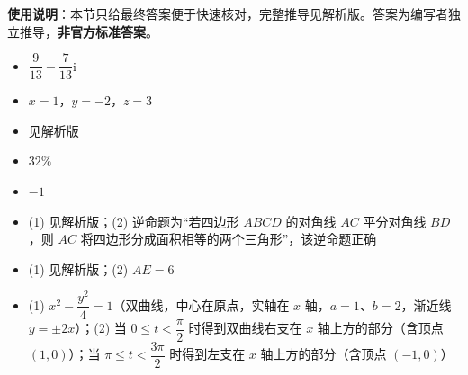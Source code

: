 
\begin{gknotice}
\textbf{使用说明}：本节只给最终答案便于快速核对，完整推导见解析版。答案为编写者独立推导，\textbf{非官方标准答案}。
\end{gknotice}

\begin{itemize}[leftmargin=2.6em]
  \item[\textbf{1.}] $\dfrac{9}{13}-\dfrac{7}{13}\mathrm i$
  \item[\textbf{2.}] $x=1$，$y=-2$，$z=3$
  \item[\textbf{3.}] 见解析版
  \item[\textbf{4.}] $32\%$
  \item[\textbf{5.}] $-1$
  \item[\textbf{6.}] (1) 见解析版；(2) 逆命题为“若四边形 $ABCD$ 的对角线 $AC$ 平分对角线 $BD$，则 $AC$ 将四边形分成面积相等的两个三角形”，该逆命题正确
  \item[\textbf{7.}] (1) 见解析版；(2) $AE=6$
  \item[\textbf{8.}] (1) $x^2-\dfrac{y^2}{4}=1$（双曲线，中心在原点，实轴在 $x$ 轴，$a=1$、$b=2$，渐近线 $y=\pm2x$）；(2) 当 $0\le t<\dfrac{\pi}{2}$ 时得到双曲线右支在 $x$ 轴上方的部分（含顶点 $(1,0)$）；当 $\pi\le t<\dfrac{3\pi}{2}$ 时得到左支在 $x$ 轴上方的部分（含顶点 $(-1,0)$）
\end{itemize}
